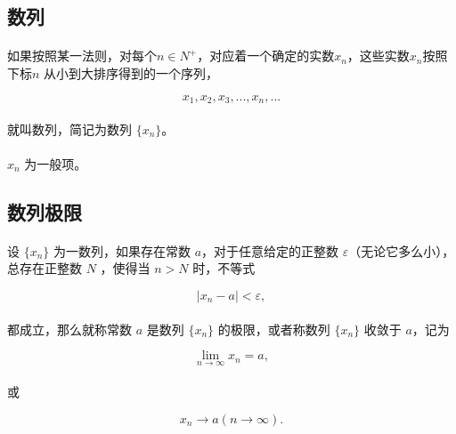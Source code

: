 \subsection{数列}
\paragraph{}
如果按照某一法则，对每个$n \in N^+$，对应着一个确定的实数$x_n$，这些实数$x_n$按照下标$n$ 从小到大排序得到的一个序列，

\begin{equation}
x_1, x_2, x_3, ..., x_n, ...
\end{equation}

\paragraph{}
就叫数列，简记为数列 $\{x_n\}$。

\paragraph{}
$x_n$ 为一般项。

\subsection{数列极限}
\paragraph{}
设 $\{x_n\}$ 为一数列，如果存在常数 $a$，对于任意给定的正整数 $\varepsilon$（无论它多么小），总存在正整数 $N$ ，使得当 $n > N$ 时，不等式

\begin{equation}
|x_n - a| < \varepsilon,
\end{equation}

\paragraph{}
都成立，那么就称常数 $a$ 是数列 $\{x_n\}$ 的极限，或者称数列 $\{x_n\}$ 收敛于 $a$，记为

\begin{equation}
\lim_{n \to \infty} x_n = a,
\end{equation}

\paragraph{}
或

\begin{equation}
x_n \to a (n \to \infty).
\end{equation}


